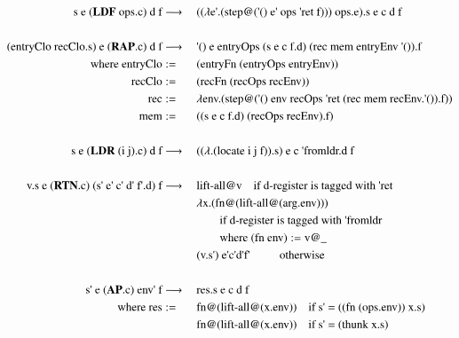 \documentclass[a4paper,12pt,twoside,openright]{report}
\theoremstyle{definition}
\newcommand{\ts}{\textquotesingle}
\begin{document}
\begin{figure}[htp!]
\centering
\begin{alignat}{5}
		\text{s e (} \mathbf{LDF} \text{ ops.c) d f} & \longrightarrow \: && \text{(($\lambda$e{\ts}.(step@({\ts}() e{\ts} ops {\ts}ret f))) ops.e).s e c d f} \label{eq:secd_sem_ldf} \\
		\nonumber \\%
		\text{(entryClo recClo.s) e (} \mathbf{RAP}\text{.c) d f} & \longrightarrow \: && \text{{\ts}() e entryOps (s e c f.d) (rec mem entryEnv {\ts}()).f} \label{eq:secd_sem_rap} \\
		\text{where entryClo} & := && \text{(entryFn (entryOps entryEnv))} \nonumber \\
		\text{recClo} & := && \text{(recFn (recOps recEnv))} \nonumber \\
		\text{rec} & := && \text{$\lambda$env.(step@({\ts}() env recOps {\ts}ret (rec mem recEnv.{\ts}()).f))} \nonumber \\
		\text{mem} & := && \text{((s e c f.d) (recOps recEnv).f)} \nonumber \\
		\nonumber \\%
		\text{s e (} \mathbf{LDR} \text{ (i j).c) d f} & \longrightarrow \: && \text{(($\lambda$.(locate i j f)).s) e c {\ts}fromldr.d f} \\
		\nonumber \\%
		\text{v.s e (} \mathbf{RTN}\text{.c) (s{\ts} e{\ts} c{\ts}  d{\ts}  f{\ts}.d) f} & \longrightarrow \:
		 && \text{lift-all@v} 									\quad	\text{if d-register is tagged with {\ts}ret}	\\
		 & && \text{$\lambda$x.(fn@(lift-all@(arg.env)))} \nonumber \\
		 & && \qquad\text{if d-register is tagged with {\ts}fromldr} \nonumber \\
		 & && \qquad\text{where (fn env)} := \text{v@\_} \nonumber \\
 		 & && \text{(v.s\ts)  e\ts  c\ts  d\ts  f\ts}	\qquad\;\;\text{otherwise} \nonumber \\
 		\nonumber \\%
		\text{s{\ts} e (} \mathbf{AP}\text{.c) env{\ts} f} & \longrightarrow \: && \text{res.s e c d f} \\
		\text{where res} & := && \text{fn@(lift-all@(x.env))\textbf{\textbf{}}} \quad\text{if s{\ts} $=$ ((fn (ops.env)) x.s)} \nonumber \\
		& && \text{fn@(lift-all@(x.env))}\quad\text{if s{\ts} $=$ (thunk x.s)} \nonumber \\

\end{alignat}
\end{figure}
\end{document}
